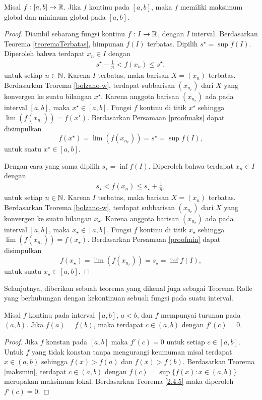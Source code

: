 \begin{teorema}\label{maksmin}
    Misal $f:[a,b] \to \mathbb{R}$. Jika $f$ kontinu pada $[a,b]$, maka $f$ memiliki maksimum global dan minimum global pada $[a,b]$.
\end{teorema}
\begin{proof}
    Diambil sebarang fungsi kontinu $f:I \to \mathbb{R}$, dengan $I$ interval. Berdasarkan Teorema \ref{teoremaTerbatas}, himpunan $f(I)$ terbatas. Dipilih $s^\star = \sup f(I)$. Diperoleh bahwa terdapat $x_n \in I$ dengan
    \begin{align}\label{proofmaks}
        s^\star - \frac{1}{n} < f(x_n) \leq s^\star,
    \end{align}
    untuk setiap $n \in \mathbb{N}$. Karena $I$ terbatas, maka barisan $X = (x_n)$ terbatas. Berdasarkan Teorema \ref{bolzano-w}, terdapat subbarisan $(x_{n_r})$ dari $X$ yang konvergen ke suatu bilangan $x^\star$. Karena anggota barisan $(x_{n_r})$ ada pada interval $[a,b]$, maka $x^\star \in [a,b]$. Fungsi $f$ kontinu di titik $x^\star$ sehingga $\lim (f(x_{n_r})) = f(x^\star)$. Berdasarkan Persamaan \eqref{proofmaks} dapat disimpulkan $$f(x^\star) = \lim (f(x_{n_r})) = s^\star = \sup f(I),$$ 
    untuk suatu $x^\star \in [a,b]$.

    Dengan cara yang sama dipilih $s_\star = \inf f(I)$. Diperoleh bahwa terdapat $x_n \in I$ dengan
    \begin{align}\label{proofmin}
        s_\star < f(x_n) \leq s_\star + \frac{1}{n},
    \end{align}
    untuk setiap $n \in \mathbb{N}$. Karena $I$ terbatas, maka barisan $X = (x_n)$ terbatas. Berdasarkan Teorema \ref{bolzano-w}, terdapat subbarisan $(x_{n_r})$ dari $X$ yang konvergen ke suatu bilangan $x_\star$. Karena anggota barisan $(x_{n_r})$ ada pada interval $[a,b]$, maka $x_\star \in [a,b]$. Fungsi $f$ kontinu di titik $x_\star$ sehingga $\lim (f(x_{n_r})) = f(x_\star)$. Berdasarkan Persamaan \eqref{proofmin} dapat disimpulkan
    $$f(x_\star) = \lim (f(x_{n_r})) = s_\star = \inf f(I),$$
    untuk suatu $x_\star \in [a,b]$.
\end{proof}

Selanjutnya, diberikan sebuah teorema yang dikenal juga sebagai Teorema Rolle yang berhubungan dengan kekontinuan sebuah fungsi pada suatu interval.

\begin{teorema}\label{rolle's}
    Misal $f$ kontinu pada interval $[a,b]$, $a<b$, dan $f$ mempunyai turunan pada $(a,b)$. Jika $f(a)=f(b)$, maka terdapat $c \in (a,b)$ dengan $f'(c)=0$.
\end{teorema}
\begin{proof}
    Jika $f$ konstan pada $[a,b]$ maka $f'(c)=0$ untuk setiap $c \in [a,b]$. Untuk $f$ yang tidak konstan tanpa mengurangi keumuman misal terdapat $x \in (a,b)$ sehingga $f(x)>f(a)$ dan $f(x)>f(b)$. Berdasarkan Teorema \ref{maksmin}, terdapat $c \in (a,b)$ dengan $f(c)=\sup\{f(x):x\in(a,b)\}$ merupakan maksimum lokal. Berdasarkan Teorema \ref{2.4.5} maka diperoleh $f'(c)=0$.
\end{proof}

